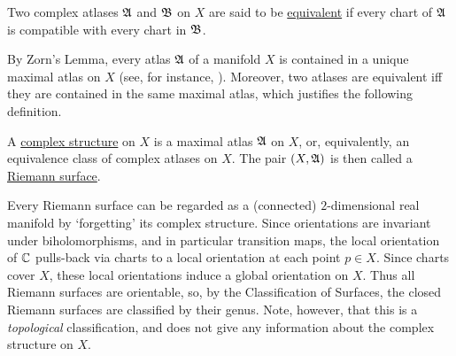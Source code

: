 \documentclass[../Moduli_Spaces_of_Riemann_Surfaces.tex]{subfiles}
\begin{document}
    \begin{definition}
        Two complex atlases $\mathfrak{A}$ and $\mathfrak{B}$ on $X$ are said to be \ul{equivalent} if every chart of $\mathfrak{A}$ is compatible with every chart in $\mathfrak{B}$.
    \end{definition}
    \begin{remark}
        By Zorn's Lemma, every atlas $\mathfrak{A}$ of a manifold $X$ is contained in a unique maximal atlas on $X$ (see, for instance, \cite[][Proposition 1.17]{leeSM}). Moreover, two atlases are equivalent iff they are contained in the same maximal atlas, which justifies the following definition.\exqed
    \end{remark}
    \begin{definition}
        A \ul{complex structure} on $X$ is a  maximal atlas $\mathfrak{A}$ on $X$, or, equivalently, an equivalence class of complex atlases on $X$. The pair $\left(X,\mathfrak{A}\right)$ is then called a \ul{Riemann surface}.
    \end{definition}
    \begin{remark}
        Every Riemann surface can be regarded as a (connected) $2$-dimensional real manifold by $\textrm{`}$forgetting$\textrm{'}$ its complex structure. Since orientations are invariant under biholomorphisms, and in particular transition maps, the local orientation of $\mathbb{C}$ pulls-back via charts to a local orientation at each point $p\in X$. Since charts cover $X$, these local orientations induce a global orientation on $X$. Thus all Riemann surfaces are orientable, so, by the Classification of Surfaces, the closed Riemann surfaces are classified by their genus. Note, however, that this is a \textit{topological} classification, and does not give any information about the complex structure on $X$.\exqed
    \end{remark}
\end{document}
